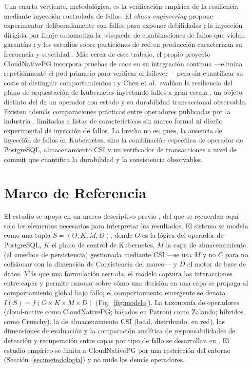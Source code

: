 \documentclass[a4paper]{llncs}
\begin{document}
Una cuarta vertiente, metodológica, es la verificación empírica de la
resiliencia mediante inyección controlada de fallos. El \emph{chaos
engineering} propone experimentar deliberadamente con fallos para exponer
debilidades \cite{basiri2016}; la inyección dirigida por linaje automatiza la
búsqueda de combinaciones de fallos que violan garantías \cite{alvaro2018}; y
los estudios sobre particiones de red en producción caracterizan su frecuencia
y severidad \cite{alquraan2018}. Más cerca de este trabajo, el propio proyecto
CloudNativePG incorpora pruebas de caos en su integración continua ---elimina
repetidamente el pod primario para verificar el failover--- pero sin cuantificar
su coste ni distinguir comportamientos \cite{drees2026}; y Chen et al.\ evalúan
la resiliencia del plano de orquestación de Kubernetes inyectando fallos a gran
escala \cite{chen2025}, un objeto distinto del de un operador con estado y su
durabilidad transaccional observable. Existen además comparaciones prácticas
entre operadores publicadas por la industria \cite{portworx},
limitadas a listas de características sin marco formal ni diseño experimental de
inyección de fallos. La brecha no es, pues, la ausencia de inyección de fallos en
Kubernetes, sino la combinación específica de operador de PostgreSQL,
almacenamiento CSI y un verificador de transacciones a nivel de commit que
cuantifica la durabilidad y la consistencia observables.

\section{Marco de Referencia}

El estudio se apoya en un marco descriptivo previo \cite{parejo2026}, del que se
recuerdan aquí solo los elementos necesarios para interpretar los resultados. El
sistema se modela como una tupla $S=(O,K,M,D)$, donde $O$ es la lógica del
operador de PostgreSQL, $K$ el plano de control de Kubernetes, $M$ la capa de
almacenamiento (el «medio» de persistencia) gestionada mediante CSI ---se usa
$M$ y no $C$ para no colisionar con la dimensión de Consistencia del marco--- y
$D$ el motor de base de datos. Más que una formulación cerrada, el modelo captura las interacciones
entre capas y permite razonar sobre cómo una decisión en una capa se propaga al
comportamiento global bajo fallo; el comportamiento emergente se denota
$I(S)=f(O\times K\times M\times D)$ (Fig.~\ref{fig:modelo}). La taxonomía de
operadores (cloud-native como CloudNativePG; basados en Patroni como Zalando;
híbridos como Crunchy), la de almacenamiento CSI (local, distribuido, en red),
las dimensiones de evaluación y la comparación analítica de responsabilidades
de detección y recuperación entre capas por tipo de fallo se desarrollan en
\cite{parejo2026}. El estudio empírico se limita a CloudNativePG por una
restricción del entorno (Sección~\ref{sec:metodologia}) y no mide los demás
operadores.
\end{document}
